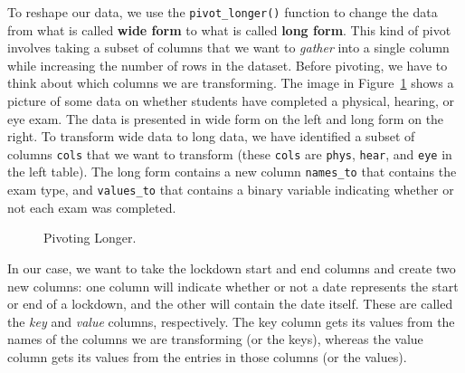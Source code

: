 \documentclass[
  letterpaper,
]{latex/krantz}
\begin{document}
To reshape our data, we use the
\texttt{pivot\_longer()}
function to change the data from what is called \textbf{wide form}
 to what is called \textbf{long form}.
This kind of pivot involves taking a subset of
columns that we want to \emph{gather} into a single column while
increasing the number of rows in the dataset. Before pivoting, we have
to think about which columns we are transforming. The image in
Figure~\ref{fig-pivot-long} shows a picture of some data on whether
students have completed a physical, hearing, or eye exam. The data is
presented in wide form on the left and long form on the right. To
transform wide data to long data, we have identified a subset of columns
\texttt{cols} that we want to transform (these \texttt{cols} are
\texttt{phys}, \texttt{hear}, and \texttt{eye} in the left table). The
long form contains a new column \texttt{names\_to} that contains the
exam type, and \texttt{values\_to} that contains a binary variable
indicating whether or not each exam was completed.

\begin{figure}


\caption{\label{fig-pivot-long}Pivoting Longer.}

\end{figure}%

In our case, we want to take the lockdown start and end columns and
create two new columns: one column will indicate whether or not a date
represents the start or end of a lockdown, and the other will contain
the date itself. These are called the \emph{key} and \emph{value}
columns, respectively. The key column gets its values from the names of
the columns we are transforming (or the keys), whereas the value column
gets its values from the entries in those columns (or the values).
\end{document}
